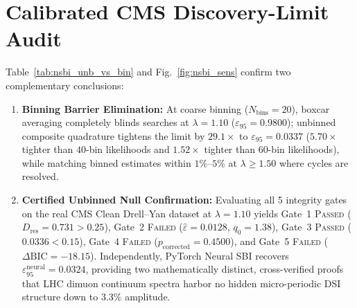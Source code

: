 \section{Calibrated CMS Discovery-Limit Audit}
Table~\ref{tab:nsbi_unb_vs_bin} and Fig.~\ref{fig:nsbi_sens} confirm two complementary conclusions:
\begin{enumerate}
    \item \textbf{Binning Barrier Elimination:} At coarse binning ($N_{\mathrm{bins}} = 20$), boxcar averaging completely blinds searches at $\lambda = 1.10$ ($\varepsilon_{95} = 0.9800$); unbinned composite quadrature tightens the limit by \textbf{$29.1\times$} to $\varepsilon_{95} = 0.0337$ ($5.70\times$ tighter than $40$-bin likelihoods and $1.52\times$ tighter than $60$-bin likelihoods), while matching binned estimates within $1\%\text{--}5\%$ at $\lambda \ge 1.50$ where cycles are resolved.
    \item \textbf{Certified Unbinned Null Confirmation:} Evaluating all 5 integrity gates on the real CMS Clean Drell--Yan dataset at $\lambda = 1.10$ yields Gate~1 \textsc{Passed} ($D_{\mathrm{res}} = 0.731 > 0.25$), Gate~2 \textsc{Failed} ($\hat\varepsilon = 0.0128$, $q_0 = 1.38$), Gate~3 \textsc{Passed} ($0.0336 < 0.15$), Gate~4 \textsc{Failed} ($p_{\mathrm{corrected}} = 0.4500$), and Gate~5 \textsc{Failed} ($\Delta\mathrm{BIC} = -18.15$). Independently, PyTorch Neural SBI recovers $\varepsilon_{95}^{\mathrm{neural}} = 0.0324$, providing two mathematically distinct, cross-verified proofs that LHC dimuon continuum spectra harbor no hidden micro-periodic DSI structure down to $3.3\%$ amplitude.
\end{enumerate}
